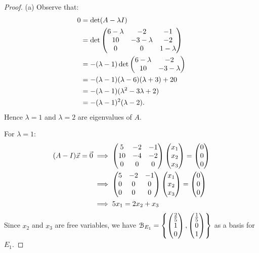 \documentclass[10pt,twoside,openany]{memoir}
\begin{document}
    {\color{blue} \begin{proof}
        (a) Observe that:
            \begin{equation*}
            \begin{split}
                0
                & = \det (A -\lambda I) \\
                & = \det \left( \begin{matrix} 6-\lambda & -2 & -1 \\ 10 & -3-\lambda & -2 \\ 0 & 0 & 1-\lambda \end{matrix} \right) \\
                & = -(\lambda-1)\det \left( \begin{matrix} 6-\lambda & -2 \\ 10 & -3-\lambda \end{matrix} \right)  \\
                & =  -(\lambda-1)(\lambda-6)(\lambda+3) + 20\\
                & = -(\lambda-1) (\lambda^2 - 3\lambda +2) \\
                & = -(\lambda-1)^2(\lambda-2).
            \end{split}
            \end{equation*}
        Hence $\lambda = 1$ and $\lambda = 2$ are eigenvalues of $A$.

        For $\lambda = 1$:
            \begin{equation*}
            \begin{split}
                (A-I)\vec{x} = \vec{0}
                & \implies \left( \begin{matrix} 5 & -2 & -1 \\ 10 & -4 & -2 \\ 0 & 0 & 0 \end{matrix} \right) \left( \begin{matrix} x_1 \\ x_2 \\ x_3 \end{matrix} \right) =\left( \begin{matrix} 0 \\ 0 \\ 0 \end{matrix} \right) \\
                & \implies \left( \begin{matrix} 5 & -2 & -1 \\ 0 & 0 & 0 \\ 0 & 0 & 0 \end{matrix} \right) \left( \begin{matrix} x_1 \\ x_2 \\ x_3 \end{matrix} \right) =\left( \begin{matrix} 0 \\ 0 \\ 0 \end{matrix} \right) \\
                & \implies 5x_1 = 2x_2 + x_3
            \end{split}
            \end{equation*}
        Since $x_2$ and $x_3$ are free variables, we have $\mathcal{B}_{E_1} = \left\{ \left( \begin{matrix} \frac{2}{5} \\ 1 \\ 0 \end{matrix} \right), \left( \begin{matrix} \frac{1}{5} \\ 0 \\ 1 \end{matrix} \right) \right\}$ as a basis for $E_1$.


\end{proof}}
\end{document}
